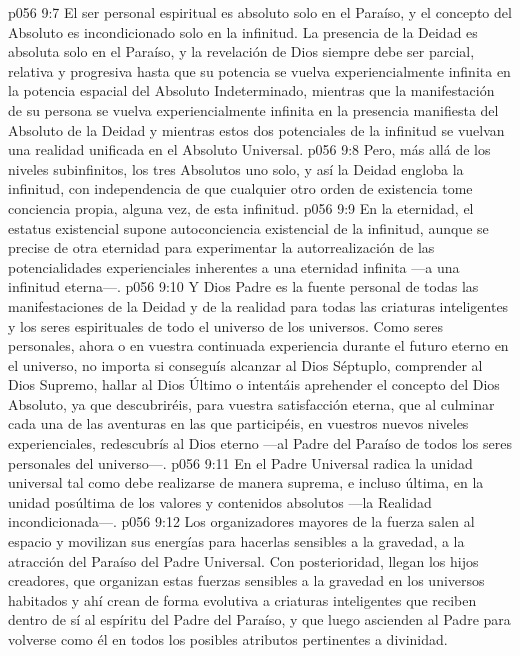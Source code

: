 \vs p056 9:7 El ser personal espiritual es absoluto solo en el Paraíso, y el concepto del Absoluto es incondicionado solo en la infinitud. La presencia de la Deidad es absoluta solo en el Paraíso, y la revelación de Dios siempre debe ser parcial, relativa y progresiva hasta que su potencia se vuelva experiencialmente infinita en la potencia espacial del Absoluto Indeterminado, mientras que la manifestación de su persona se vuelva experiencialmente infinita en la presencia manifiesta del Absoluto de la Deidad y mientras estos dos potenciales de la infinitud se vuelvan una realidad unificada en el Absoluto Universal.
\vs p056 9:8 Pero, más allá de los niveles subinfinitos, los tres Absolutos  uno solo, y así la Deidad engloba la infinitud, con independencia de que cualquier otro orden de existencia tome conciencia propia, alguna vez, de esta infinitud.
\vs p056 9:9 En la eternidad, el estatus existencial supone autoconciencia existencial de la infinitud, aunque se precise de otra eternidad para experimentar la autorrealización de las potencialidades experienciales inherentes a una eternidad infinita ---a una infinitud eterna---.
\vs p056 9:10 \pc Y Dios Padre es la fuente personal de todas las manifestaciones de la Deidad y de la realidad para todas las criaturas inteligentes y los seres espirituales de todo el universo de los universos. Como seres personales, ahora o en vuestra continuada experiencia durante el futuro eterno en el universo, no importa si conseguís alcanzar al Dios Séptuplo, comprender al Dios Supremo, hallar al Dios Último o intentáis aprehender el concepto del Dios Absoluto, ya que descubriréis, para vuestra satisfacción eterna, que al culminar cada una de las aventuras en las que participéis, en vuestros nuevos niveles experienciales, redescubrís al Dios eterno ---al Padre del Paraíso de todos los seres personales del universo---.
\vs p056 9:11 En el Padre Universal radica la unidad universal tal como debe realizarse de manera suprema, e incluso última, en la unidad posúltima de los valores y contenidos absolutos ---la Realidad incondicionada---.
\vs p056 9:12 Los organizadores mayores de la fuerza salen al espacio y movilizan sus energías para hacerlas sensibles a la gravedad, a la atracción del Paraíso del Padre Universal. Con posterioridad, llegan los hijos creadores, que organizan estas fuerzas sensibles a la gravedad en los universos habitados y ahí crean de forma evolutiva a criaturas inteligentes que reciben dentro de sí al espíritu del Padre del Paraíso, y que luego ascienden al Padre para volverse como él en todos los posibles atributos pertinentes a divinidad.
